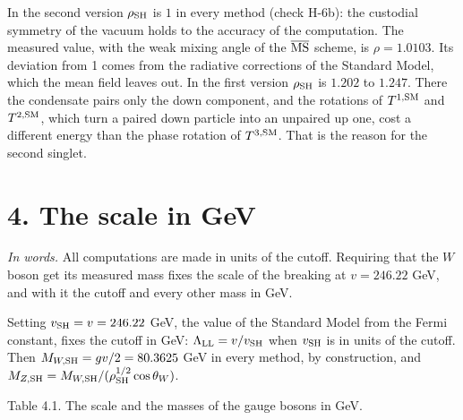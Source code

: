 \documentclass[
  10pt,
]{article}
\begin{document}
In the second version \(\rho_{\rm SH}\) is \(1\) in every method (check
H-6b): the custodial symmetry of the vacuum holds to the accuracy of the
computation. The measured value, with the weak mixing angle of the
\(\overline{\rm MS}\) scheme, is \(\rho=1.0103\). Its deviation from 1
comes from the radiative corrections of the Standard Model, which the
mean field leaves out. In the first version \(\rho_{\rm SH}\) is
\(1.202\) to \(1.247\). There the condensate pairs only the down
component, and the rotations of \(T^{1,{\rm SM}}\) and
\(T^{2,{\rm SM}}\), which turn a paired down particle into an unpaired
up one, cost a different energy than the phase rotation of
\(T^{3,{\rm SM}}\). That is the reason for the second singlet.

\hypertarget{the-scale-in-gev}{%
\section{4. The scale in GeV}\label{the-scale-in-gev}}

\emph{In words.} All computations are made in units of the cutoff.
Requiring that the \(W\) boson get its measured mass fixes the scale of
the breaking at \(v=246.22\) GeV, and with it the cutoff and every other
mass in GeV.

Setting \(v_{\rm SH}=v=246.22\) GeV, the value of the Standard Model
from the Fermi constant, fixes the cutoff in GeV:
\(\Lambda_{\rm LL}=v/v_{\rm SH}\) when \(v_{\rm SH}\) is in units of the
cutoff. Then \(M_{W,{\rm SH}}=gv/2=80.3625\) GeV in every method, by
construction, and
\(M_{Z,{\rm SH}}=M_{W,{\rm SH}}/(\rho_{\rm SH}^{1/2}\cos\theta_W)\).

Table 4.1. The scale and the masses of the gauge bosons in GeV.
\end{document}
